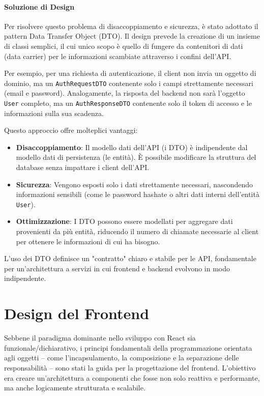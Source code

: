 \documentclass[12pt,a4paper,openright,twoside]{book}
\begin{document}
\paragraph{Soluzione di Design}
Per risolvere questo problema di disaccoppiamento e sicurezza, è stato adottato il pattern Data Transfer Object (DTO). Il design prevede la creazione di un insieme di classi semplici, il cui unico scopo è quello di fungere da contenitori di dati (data carrier) per le informazioni scambiate attraverso i confini dell'API.

Per esempio, per una richiesta di autenticazione, il client non invia un oggetto di dominio, ma un \texttt{AuthRequestDTO} contenente solo i campi strettamente necessari (email e password). Analogamente, la risposta del backend non sarà l'oggetto \texttt{User} completo, ma un \texttt{AuthResponseDTO} contenente solo il token di accesso e le informazioni sulla sua scadenza.

Questo approccio offre molteplici vantaggi:
\begin{itemize}
    \item \textbf{Disaccoppiamento}: Il modello dati dell'API (i DTO) è indipendente dal modello dati di persistenza (le entità). È possibile modificare la struttura del database senza impattare i client dell'API.
    \item \textbf{Sicurezza}: Vengono esposti solo i dati strettamente necessari, nascondendo informazioni sensibili (come le password hashate o altri dati interni dell'entità \texttt{User}).
    \item \textbf{Ottimizzazione}: I DTO possono essere modellati per aggregare dati provenienti da più entità, riducendo il numero di chiamate necessarie al client per ottenere le informazioni di cui ha bisogno.
\end{itemize}

L'uso dei DTO definisce un "contratto" chiaro e stabile per le API, fondamentale per un'architettura a servizi in cui frontend e backend evolvono in modo indipendente.

\section{Design del Frontend}
\label{sec:design_frontend}

Sebbene il paradigma dominante nello sviluppo con React sia funzionale/dichiarativo, i principi fondamentali della programmazione orientata agli oggetti -- come l'incapsulamento, la composizione e la separazione delle responsabilità -- sono stati la guida per la progettazione del frontend. L'obiettivo era creare un'architettura a componenti che fosse non solo reattiva e performante, ma anche logicamente strutturata e scalabile.
\end{document}
